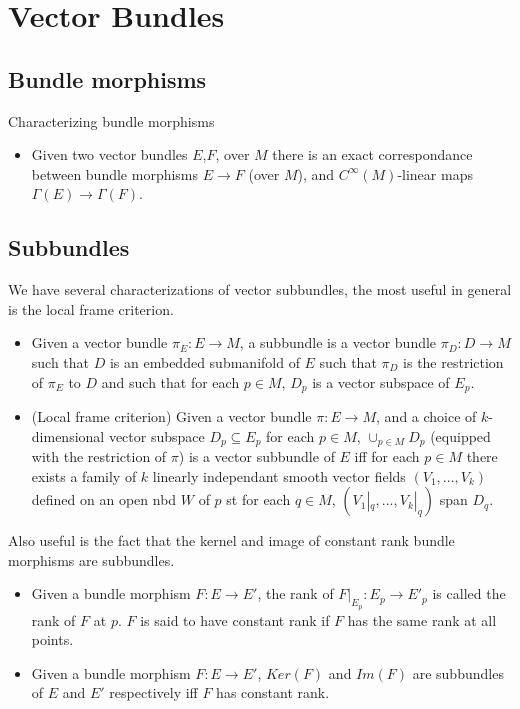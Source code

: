 \documentclass{report}
\theoremstyle{definition}
\begin{document}
\section{Vector Bundles}

\subsection{Bundle morphisms}

Characterizing bundle morphisms
\begin{itemize}
    \item Given two vector bundles $E$,$F$, over $M$ there is an exact correspondance between bundle morphisms $E\to F$ (over $M$), and $C^{\infty}(M)$-linear maps $\Gamma(E)\to\Gamma(F)$.
\end{itemize}

\subsection{Subbundles}

We have several characterizations of vector subbundles, the most useful in general is the local frame criterion.

\begin{itemize}
    \item Given a vector bundle $\pi_E:E\to M$, a subbundle is a vector bundle $\pi_D:D\to M$ such that $D$ is an embedded submanifold of $E$ such that $\pi_D$ is the restriction of $\pi_E$ to $D$ and such that for each $p\in M$, $D_p$ is a vector subspace of $E_p$.
    \item (Local frame criterion)\label{LocalFrameCriterion} Given a vector bundle $\pi:E\to M$, and a choice of $k$-dimensional vector subspace $D_p\subseteq E_p$ for each $p\in M$, $\cup_{p\in M}D_p$ (equipped with the restriction of $\pi$) is a vector subbundle of $E$ iff for each $p\in M$ there exists a family of $k$ linearly independant smooth vector fields $(V_1,...,V_k)$ defined on an open nbd $W$ of $p$ st for each $q\in M$, $(V_1|_q,...,V_k|_q)$ span $D_q$.
\end{itemize}

Also useful is the fact that the kernel and image of constant rank bundle morphisms are subbundles.
\begin{itemize}
    \item Given a bundle morphism $F:E\to E'$, the rank of $F|_{E_p}:E_p\to E'_p$ is called the rank of $F$ at $p$. $F$ is said to have constant rank if $F$ has the same rank at all points.
    \item Given a bundle morphism $F:E\to E'$, $Ker(F)$ and $Im(F)$ are subbundles of $E$ and $E'$ respectively iff $F$ has constant rank.
\end{itemize}
\end{document}
